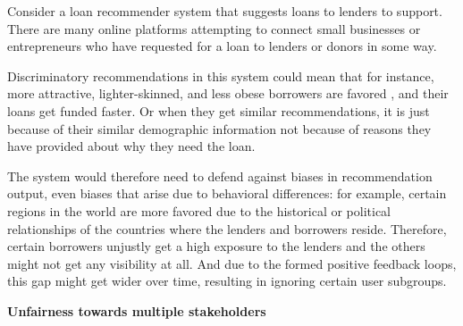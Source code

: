 Consider a loan recommender system that suggests loans to lenders to support. There are many online platforms attempting to connect small businesses or entrepreneurs who have requested for a loan to lenders or donors in some way. 

Discriminatory recommendations in this system could mean that for instance, more attractive, lighter-skinned, and less obese borrowers are favored \cite{JENQ2015234}, and their loans get funded faster. Or when they get similar recommendations, it is just because of their similar demographic information not because of reasons they have provided about why they need the loan.

The system would therefore need to defend against biases in recommendation output, even biases that arise due to behavioral differences: for example, certain regions in the world are more favored due to the historical or political relationships of the countries where the lenders and borrowers reside. Therefore, certain borrowers unjustly get a high exposure to the lenders and the others might not get any visibility at all. And due to the formed positive feedback loops, this gap might get wider over time, resulting in ignoring certain user subgroups.




\textbf{Unfairness towards multiple stakeholders}

